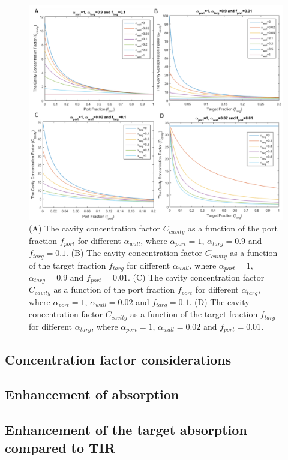 \documentclass[a4paper]{article}
\begin{document}
\begin{figure}
\centering
\includegraphics[width=1\textwidth]{figures/concentration_vs_parameters.png}
\caption{(A) The cavity concentration factor $C_{cavity}$ as a function of the port fraction $f_{port}$ for different $\alpha_{wall}$, where  $\alpha_{port}=1$, $\alpha_{targ}=0.9$ and $f_{targ}=0.1$. (B) The cavity concentration factor $C_{cavity}$ as a function of the target fraction $f_{targ}$ for different $\alpha_{wall}$, where $\alpha_{port}=1$, $\alpha_{targ}=0.9$ and $f_{port}=0.01$. (C) The cavity concentration factor $C_{cavity}$ as a function of the port fraction $f_{port}$ for different $\alpha_{targ}$, where $\alpha_{port}=1$, $\alpha_{wall}=0.02$ and $f_{targ}=0.1$. (D) The cavity concentration factor $C_{cavity}$ as a function of the target fraction $f_{targ}$ for different $\alpha_{targ}$, where $\alpha_{port}=1$, $\alpha_{wall}=0.02$ and $f_{port}=0.01$.}
\label{fig:concentration_factor}
\end{figure}

\subsection{Concentration factor considerations}
\subsection{Enhancement of absorption}
\subsection{Enhancement of the target absorption compared to TIR}
\end{document}
